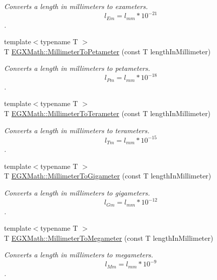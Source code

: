 \begin{DoxyCompactItemize}
\begin{DoxyCompactList}\small\item\em Converts a length in millimeters to exameters. \[ l_{Em}=l_{mm} * 10^{-21} \]. \end{DoxyCompactList}\item 
{\footnotesize template$<$typename T $>$ }\\T \mbox{\hyperlink{group___e_g_x_math-_conversions-_length_conversions-_s_i-_millimeter-_s_i_ga02c5ee4941d1915c4d6d2b96788bb89f}{E\+G\+X\+Math\+::\+Millimeter\+To\+Petameter}} (const T length\+In\+Millimeter)
\begin{DoxyCompactList}\small\item\em Converts a length in millimeters to petameters. \[ l_{Pm}=l_{mm} * 10^{-18} \]. \end{DoxyCompactList}\item 
{\footnotesize template$<$typename T $>$ }\\T \mbox{\hyperlink{group___e_g_x_math-_conversions-_length_conversions-_s_i-_millimeter-_s_i_ga0bd88917339b280d5df05adfddc6661a}{E\+G\+X\+Math\+::\+Millimeter\+To\+Terameter}} (const T length\+In\+Millimeter)
\begin{DoxyCompactList}\small\item\em Converts a length in millimeters to terameters. \[ l_{Tm}=l_{mm} * 10^{-15} \]. \end{DoxyCompactList}\item 
{\footnotesize template$<$typename T $>$ }\\T \mbox{\hyperlink{group___e_g_x_math-_conversions-_length_conversions-_s_i-_millimeter-_s_i_gaeadd93f73f66f5b904919def3d44e858}{E\+G\+X\+Math\+::\+Millimeter\+To\+Gigameter}} (const T length\+In\+Millimeter)
\begin{DoxyCompactList}\small\item\em Converts a length in millimeters to gigameters. \[ l_{Gm}=l_{mm} * 10^{-12} \]. \end{DoxyCompactList}\item 
{\footnotesize template$<$typename T $>$ }\\T \mbox{\hyperlink{group___e_g_x_math-_conversions-_length_conversions-_s_i-_millimeter-_s_i_ga2e4c24dcd2559aebefe78e13fbd0e394}{E\+G\+X\+Math\+::\+Millimeter\+To\+Megameter}} (const T length\+In\+Millimeter)
\begin{DoxyCompactList}\small\item\em Converts a length in millimeters to megameters. \[ l_{Mm}=l_{mm} * 10^{-9} \]. \end{DoxyCompactList}\item 

\end{DoxyCompactItemize}
